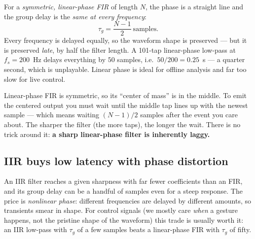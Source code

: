 \begin{happeningbox}
For a \emph{symmetric, linear-phase FIR} of length $N$, the phase is a straight
line and the group delay is the \emph{same at every frequency}:
\[
  \tau_g = \frac{N-1}{2}\ \text{samples}.
\]
Every frequency is delayed equally, so the waveform shape is preserved --- but it
is preserved \emph{late}, by half the filter length. A 101-tap linear-phase
low-pass at $f_s = 200$~Hz delays everything by $50$ samples, i.e.\ $50/200 =
0.25$~s --- a quarter second, which is unplayable. Linear phase is ideal for
offline analysis and far too slow for live control.
\end{happeningbox}

\begin{intuitionbox}
Linear-phase FIR is symmetric, so its ``center of mass'' is in the middle. To
emit the centered output you must wait until the middle tap lines up with the
newest sample --- which means waiting $(N-1)/2$ samples after the event you care
about. The sharper the filter (the more taps), the longer the wait. There is no
trick around it: \textbf{a sharp linear-phase filter is inherently laggy.}
\end{intuitionbox}

\subsection{IIR buys low latency with phase distortion}

An IIR filter reaches a given sharpness with far fewer coefficients than an FIR,
and its group delay can be a handful of samples even for a steep response. The
price is \emph{nonlinear phase}: different frequencies are delayed by different
amounts, so transients smear in shape. For control signals (we mostly care
\emph{when} a gesture happens, not the pristine shape of the waveform) this trade
is usually worth it: an IIR low-pass with $\tau_g$ of a few samples beats a
linear-phase FIR with $\tau_g$ of fifty.

